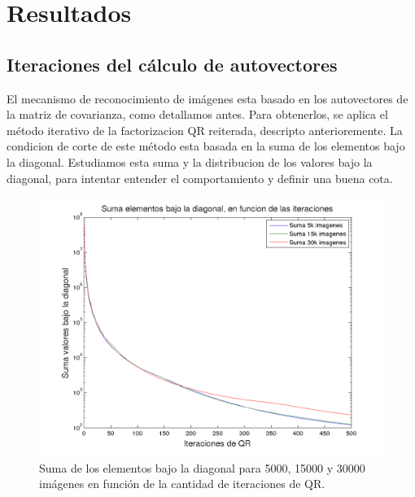 \section{Resultados}

\subsection{Iteraciones del c\'alculo de autovectores}
El mecanismo de reconocimiento de im\'agenes esta basado en los autovectores
de la matriz de covarianza, como detallamos antes. Para obtenerlos, se aplica
el m\'etodo iterativo de la factorizacion QR reiterada, descripto anterioremente.
La condicion de corte de este m\'etodo esta basada en la suma de los elementos bajo
la diagonal. Estudiamos esta suma y la distribucion de los valores bajo la diagonal,
para intentar entender el comportamiento y definir una buena cota. 

\def \hrwidth {500pt}

\begin{figure}[H]
\begin {center}
\includegraphics[width=\hrwidth]{plots/SUM.png}
\end {center}
\caption{Suma de los elementos bajo la diagonal para 5000, 15000 y 30000 im\'agenes
en funci\'on de la cantidad de iteraciones de QR.}
\label{fig:SUM}
\end{figure}

